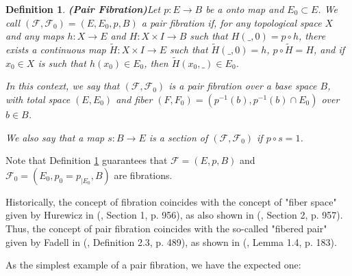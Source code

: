 \documentclass[12pt,oneside]{book}
\newtheorem{defi}   {Definition}[chapter]
\newcommand{\wt}{\widetilde}
\begin{document}
    \begin{defi}{\bf (Pair Fibration)}\label{defi_par-fib}
        Let $p:E\to B$ be a onto map and $E_{0}\subset E$. We call $(\mathcal{F},\mathcal{F}_{0})=(E,E_{0},p,B)$ a pair 
        fibration if, for any topological space $X$ and any maps $h:X\to E$ and $H:X\times I\to B$ such that 
        $H(\_,0)=p\circ h$, there exists a continuous map $\wt{H}:X\times I\to E$ such that $\wt{H}(\_,0)=h$, $p\circ\wt{H}=H$, and if 
        $x_{0}\in X$ is such that $h(x_{0})\in E_{0}$, then $\wt{H}(x_{0},\_)\in E_{0}$.
    
        In this context, we say that $(\mathcal{F},\mathcal{F}_{0})$ is a pair fibration over a base space $B$, with total space $(E,E_{0})$ 
        and fiber $(F,F_{0})=(p^{-1}(b),p^{-1}(b)\cap E_{0})$ over $b\in B$.
    
        We also say that a map $s:B\to E$ is a section of $(\mathcal{F},\mathcal{F}_{0})$ if $p\circ s=1$.
    \end{defi}
    
    Note that Definition \ref{defi_par-fib} guarantees that $\mathcal{F}=(E,p,B)$ and $\mathcal{F}_{0}=(E_{0},p_{0}=p_{|E_{0}},B)$ are 
    fibrations.
    
    Historically, the concept of fibration coincides with the concept of "fiber space" given by Hurewicz in 
    (\cite{hurewicz}, Section 1, p. 956), as also shown in (\cite{hurewicz}, Section 2, p. 957). Thus, the concept of pair fibration 
    coincides with the so-called "fibered pair" given by Fadell in (\cite{fadell_1}, Definition 2.3, p. 489), as shown 
    in (\cite{brown}, Lemma 1.4, p. 183).
    
    As the simplest example of a pair fibration, we have the expected one:
\end{document}
